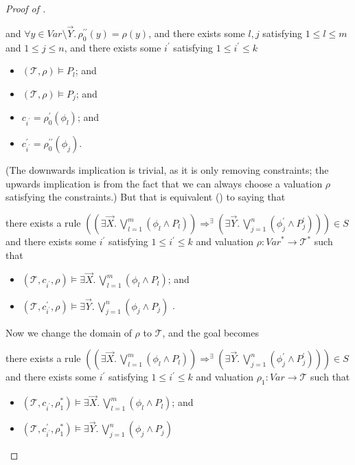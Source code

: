 \documentclass{article}
\newenvironment{proofenv}
  {
    \VerbatimEnvironment\begin{tcolorbox}[colback=black!0!white] %
  }
  {
   \end{tcolorbox}
  }
\begin{document}
\begin{proof}[Proof of ]
\begin{proofenv}
and $\forall y \in \mathit{Var} \setminus \vec{Y}.\, \rho_0^{\prime\prime}(y) = \rho(y)$,
and there exists some $l,j$ satisfying $1 \leq l \leq m$ and $1 \leq j \leq n$,
and there exists some $i^\prime$ satisfying $1 \leq i^\prime \leq k$
\begin{itemize}
    \item $(\mathcal{T}, \rho) \vDash P_l$; and
    \item $(\mathcal{T}, \rho) \vDash P_j$; and
    \item $c_{i^\prime} = \rho_0^\prime(\phi_l)$; and
    \item $c^\prime_{i^\prime} = \rho_0^{\prime\prime}(\phi_j)$.
\end{itemize}
\end{proofenv}
(The downwards implication is trivial, as it is only removing constraints; the upwards implication
is from the fact that we can always choose a valuation $\rho$ satisfying the constraints.)
But that is equivalent () to saying that 
\begin{proofenv}
there exists a rule $((\exists \vec{X}.\, \bigvee_{l=1}^{m} (\phi_l \land P_l)) \Rightarrow^\exists (\exists \vec{Y}.\, \bigvee_{j=1}^{n} (\phi^\prime_j \land P^\prime_j))) \in S$
and there exists some $i^\prime$ satisfying $1 \leq i^\prime \leq k$
and valuation $\rho : \mathit{Var}^* \to \mathcal{T}^*$ such that
\begin{itemize}
    \item $(\mathcal{T}, c_{i^\prime}, \rho) \vDash \exists \vec{X}.\, \bigvee_{l=1}^{m} (\phi_l \land P_l)$; and
    \item $(\mathcal{T}, c^\prime_{i^\prime}, \rho) \vDash \exists \vec{Y}.\, \bigvee_{j=1}^{n} (\phi_j \land P_j)$
    .
\end{itemize}
\end{proofenv}
Now we change the domain of $\rho$ to $\mathcal{T}$, and the goal becomes
\begin{proofenv}
there exists a rule $((\exists \vec{X}.\, \bigvee_{l=1}^{m} (\phi_l \land P_l)) \Rightarrow^\exists (\exists \vec{Y}.\, \bigvee_{j=1}^{n} (\phi^\prime_j \land P^\prime_j))) \in S$
and there exists some $i^\prime$ satisfying $1 \leq i^\prime \leq k$
and valuation $\rho_1 : \mathit{Var} \to \mathcal{T}$ such that
\begin{itemize}
    \item $(\mathcal{T}, c_{i^\prime}, \rho_1^*) \vDash \exists \vec{X}.\, \bigvee_{l=1}^{m} (\phi_l \land P_l)$; and
    \item $(\mathcal{T}, c^\prime_{i^\prime}, \rho_1^*) \vDash \exists \vec{Y}.\, \bigvee_{j=1}^{n} (\phi_j \land P_j)$

\end{itemize}
\end{proofenv}
\end{proof}
\end{document}
